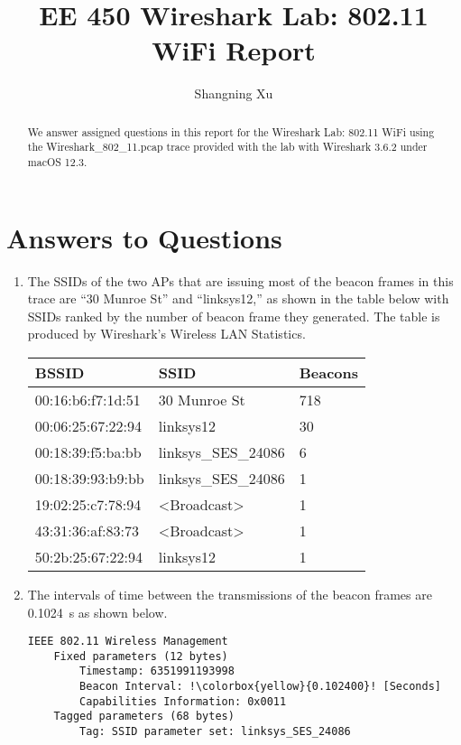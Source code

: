 \documentclass{article}
\title{EE 450 Wireshark Lab: 802.11 WiFi Report}
\author{Shangning Xu}
\begin{document}
\maketitle
\newpage

\begin{abstract}
    We answer assigned questions in this report for the Wireshark Lab: 802.11 WiFi using the Wireshark\_802\_11.pcap trace provided with the lab with Wireshark 3.6.2 under macOS 12.3.
\end{abstract}

\section{Answers to Questions}

\begin{enumerate}
    \item The SSIDs of the two APs that are issuing most of the beacon frames in this trace are ``30 Munroe St'' and ``linksys12,'' as shown in the table below with SSIDs ranked by the number of beacon frame they generated. The table is produced by Wireshark's Wireless LAN Statistics.
    
    \begin{tabular}{@{}lll@{}}
        \toprule
        BSSID & SSID & Beacons \\ \midrule
        00:16:b6:f7:1d:51 & 30 Munroe St & 718 \\
        00:06:25:67:22:94 & linksys12 & 30 \\
        00:18:39:f5:ba:bb & linksys\_SES\_24086 & 6 \\
        00:18:39:93:b9:bb & linksys\_SES\_24086 & 1 \\
        19:02:25:c7:78:94 & \textless{}Broadcast\textgreater{} & 1 \\
        43:31:36:af:83:73 & \textless{}Broadcast\textgreater{} & 1 \\
        50:2b:25:67:22:94 & linksys12 & 1 \\ \bottomrule
    \end{tabular}

    \item The intervals of time between the transmissions of the beacon frames are \SI{0.1024}{s} as shown below.
\begin{verbatim}
IEEE 802.11 Wireless Management
    Fixed parameters (12 bytes)
        Timestamp: 6351991193998
        Beacon Interval: !\colorbox{yellow}{0.102400}! [Seconds]
        Capabilities Information: 0x0011
    Tagged parameters (68 bytes)
        Tag: SSID parameter set: linksys_SES_24086
\end{verbatim}


\end{enumerate}
\end{document}
